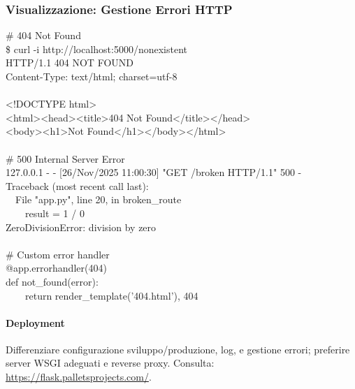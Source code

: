 \begin{center}
\end{center}

\subsubsection{Visualizzazione: Gestione Errori HTTP}
\begin{tcolorbox}[title=Output Terminale: Errori HTTP, colback=black, coltext=green!80, fontupper=\ttfamily\small]
\# 404 Not Found\\
\$ curl -i http://localhost:5000/nonexistent\\
HTTP/1.1 404 NOT FOUND\\
Content-Type: text/html; charset=utf-8\\
\\
<!DOCTYPE html>\\
<html><head><title>404 Not Found</title></head>\\
<body><h1>Not Found</h1></body></html>\\
\\
\# 500 Internal Server Error\\
127.0.0.1 - - [26/Nov/2025 11:00:30] "GET /broken HTTP/1.1" 500 -\\
Traceback (most recent call last):\\
\ \ File "app.py", line 20, in broken\_route\\
\ \ \ \ result = 1 / 0\\
ZeroDivisionError: division by zero\\
\\
\# Custom error handler\\
@app.errorhandler(404)\\
def not\_found(error):\\
\ \ \ \ return render\_template('404.html'), 404
\end{tcolorbox}

\paragraph{Deployment} Differenziare configurazione sviluppo/produzione, log, e gestione errori; preferire server WSGI adeguati e reverse proxy.
Consulta: \url{https://flask.palletsprojects.com/}.
